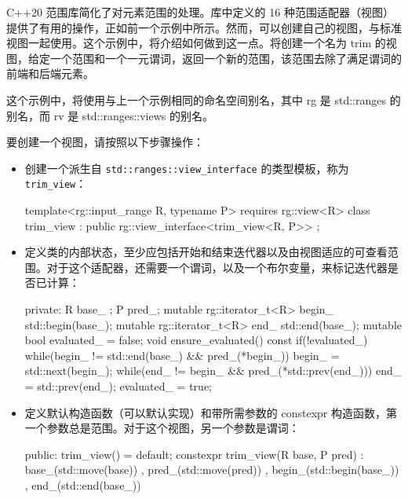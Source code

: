 
C++20 范围库简化了对元素范围的处理。库中定义的 16 种范围适配器（视图）提供了有用的操作，正如前一个示例中所示。然而，可以创建自己的视图，与标准视图一起使用。这个示例中，将介绍如何做到这一点。将创建一个名为 trim 的视图，给定一个范围和一个一元谓词，返回一个新的范围，该范围去除了满足谓词的前端和后端元素。


这个示例中，将使用与上一个示例相同的命名空间别名，其中 rg 是 std::ranges 的别名，而 rv 是 std::ranges::views 的别名。


要创建一个视图，请按照以下步骤操作：

\begin{itemize}
\item
创建一个派生自 \verb|std::ranges::view_interface| 的类型模板，称为 \verb|trim_view|：

\begin{cpp}
template<rg::input_range R, typename P>
    requires rg::view<R>
class trim_view :
    public rg::view_interface<trim_view<R, P>>
{
};
\end{cpp}

\item
定义类的内部状态，至少应包括开始和结束迭代器以及由视图适应的可查看范围。对于这个适配器，还需要一个谓词，以及一个布尔变量，来标记迭代器是否已计算：

\begin{cpp}
private:
    R base_ {};
    P pred_;
    mutable rg::iterator_t<R> begin_ {std::begin(base_)};
    mutable rg::iterator_t<R> end_   {std::end(base_)};
    mutable bool evaluated_ = false;
    void ensure_evaluated() const
    {
        if(!evaluated_)
        {
            while(begin_ != std::end(base_) && pred_(*begin_))
                {begin_ = std::next(begin_);}
            while(end_ != begin_ && pred_(*std::prev(end_)))
                {end_ = std::prev(end_);}
                evaluated_ = true;
        }
    }
\end{cpp}

\item
定义默认构造函数（可以默认实现）和带所需参数的 constexpr 构造函数，第一个参数总是范围。对于这个视图，另一个参数是谓词：

\begin{cpp}
public:
    trim_view() = default;
    constexpr trim_view(R base, P pred)
        : base_(std::move(base))
        , pred_(std::move(pred))
        , begin_(std::begin(base_))
        , end_(std::end(base_))
    {}
\end{cpp}


\end{itemize}
